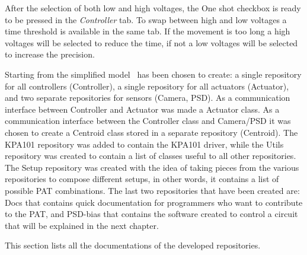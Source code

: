 After the selection of both low and high voltages, the One shot checkbox is ready to be pressed in the \emph{Controller} tab. To
swap between high and low voltages a time threshold is available in the same tab. If the movement is too long a high voltages will be selected to reduce the time, if not a low voltages will be selected to increase the precision.

Starting from the simplified model~ has been chosen to create: a single repository for all controllers (Controller), a single repository for all actuators (Actuator), and two separate repositories for sensors (Camera, PSD).
As a communication interface between Controller and Actuator was made a Actuator class. As a communication interface between the Controller class and Camera/PSD it was chosen to create a Centroid class stored in a separate repository (Centroid).
The KPA101 repository was added to contain the KPA101 driver, while the Utils repository was created to contain a list of classes useful to all other repositories.
The Setup repository was created with the idea of taking pieces from the various repositories to compose different setups, in other words, it contains a list of possible PAT combinations.
The last two repositories that have been created are: Docs that contains quick documentation for programmers who want to contribute to the PAT, and PSD-bias that contains the software created to control a circuit that will be explained in the next chapter.

This section lists all the documentations of the developed repositories.

      {\parindent0pt
            
            
            
            
            
            
            
            
      }